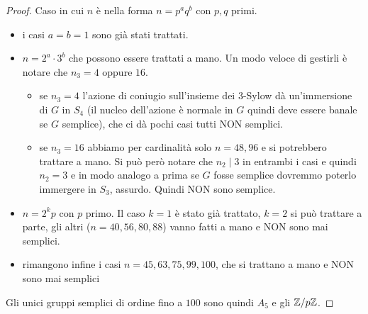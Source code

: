 \begin{proof}
    Caso in cui $n$ è nella forma $n = p^aq^b$ con $p,q$ primi.
    \begin{itemize}
        \item i casi $a = b = 1$ sono già stati trattati.
        \item $n = 2^a \cdot 3^b$ che possono essere trattati a mano. Un modo veloce di gestirli è notare che $n_3 = 4$ oppure $16$. 
        \begin{itemize}
        \item se $n_3 = 4$ l'azione di coniugio sull'insieme dei $3$-Sylow dà un'immersione di $G$ in $S_4$ (il nucleo dell'azione è normale in $G$ quindi deve essere banale se $G$ semplice), che ci dà pochi casi tutti NON semplici.
        \item se $n_3 = 16$ abbiamo per cardinalità solo $n = 48,96$ e si potrebbero trattare a mano. Si può però notare che $n_2  \mid  3$ in entrambi i casi e quindi $n_2 = 3$ e in modo analogo a prima se $G$ fosse semplice dovremmo poterlo immergere in $S_3$, assurdo. Quindi NON sono semplice.
    \end{itemize} 
        \item $n = 2^kp$ con $p$ primo. Il caso $k=1$ è stato già trattato, $k = 2$ si può trattare a parte, gli altri ($n = 40,56,80,88$) vanno fatti a mano e NON sono mai semplici.
        \item rimangono infine i casi $n = 45,63,75,99,100$, che si trattano a mano e NON sono mai semplici
    \end{itemize}
    
    Gli unici gruppi semplici di ordine fino a $100$ sono quindi $A_5$ e gli $\mathbb{Z}/p\mathbb{Z}$.
\end{proof}


